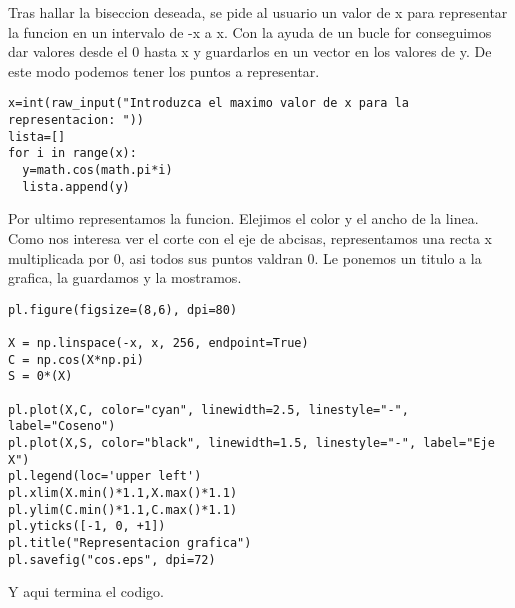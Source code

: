 Tras hallar la biseccion deseada, se pide al usuario un valor de x para representar la funcion en un intervalo de -x a x. Con la ayuda de un bucle for conseguimos dar valores desde el 0 hasta x y guardarlos en un vector en los valores de y. De este modo podemos tener los puntos a representar.

\begin{verbatim}
x=int(raw_input("Introduzca el maximo valor de x para la representacion: "))
lista=[]
for i in range(x):
  y=math.cos(math.pi*i)
  lista.append(y)
\end{verbatim}

Por ultimo representamos la funcion. Elejimos el color y el ancho de la linea. Como nos interesa ver el corte con el eje de abcisas, representamos una recta x multiplicada por 0, asi todos sus puntos valdran 0. Le ponemos un titulo a la grafica, la guardamos y la mostramos. 
\begin{verbatim}
pl.figure(figsize=(8,6), dpi=80)

X = np.linspace(-x, x, 256, endpoint=True)
C = np.cos(X*np.pi)
S = 0*(X)

pl.plot(X,C, color="cyan", linewidth=2.5, linestyle="-", label="Coseno")
pl.plot(X,S, color="black", linewidth=1.5, linestyle="-", label="Eje X")
pl.legend(loc='upper left')
pl.xlim(X.min()*1.1,X.max()*1.1)
pl.ylim(C.min()*1.1,C.max()*1.1)
pl.yticks([-1, 0, +1])
pl.title("Representacion grafica")
pl.savefig("cos.eps", dpi=72)
\end{verbatim}

Y aqui termina el codigo.